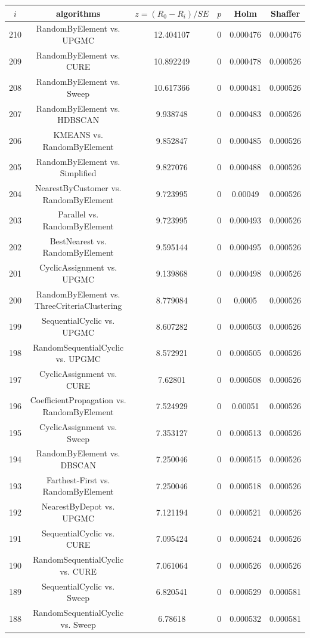 \documentclass[a4paper,10pt]{article}
\begin{document}
\begin{landscape}
\begin{table}[!htp]
\centering\scriptsize
\begin{tabular}{cccccc}
$i$&algorithms&$z=(R_0 - R_i)/SE$&$p$&Holm&Shaffer\\
\hline210&RandomByElement vs. UPGMC&12.404107&0&0.000476&0.000476\\
209&RandomByElement vs. CURE&10.892249&0&0.000478&0.000526\\
208&RandomByElement vs. Sweep&10.617366&0&0.000481&0.000526\\
207&RandomByElement vs. HDBSCAN&9.938748&0&0.000483&0.000526\\
206&KMEANS vs. RandomByElement&9.852847&0&0.000485&0.000526\\
205&RandomByElement vs. Simplified&9.827076&0&0.000488&0.000526\\
204&NearestByCustomer vs. RandomByElement&9.723995&0&0.00049&0.000526\\
203&Parallel vs. RandomByElement&9.723995&0&0.000493&0.000526\\
202&BestNearest vs. RandomByElement&9.595144&0&0.000495&0.000526\\
201&CyclicAssignment vs. UPGMC&9.139868&0&0.000498&0.000526\\
200&RandomByElement vs. ThreeCriteriaClustering&8.779084&0&0.0005&0.000526\\
199&SequentialCyclic vs. UPGMC&8.607282&0&0.000503&0.000526\\
198&RandomSequentialCyclic vs. UPGMC&8.572921&0&0.000505&0.000526\\
197&CyclicAssignment vs. CURE&7.62801&0&0.000508&0.000526\\
196&CoefficientPropagation vs. RandomByElement&7.524929&0&0.00051&0.000526\\
195&CyclicAssignment vs. Sweep&7.353127&0&0.000513&0.000526\\
194&RandomByElement vs. DBSCAN&7.250046&0&0.000515&0.000526\\
193&Farthest-First vs. RandomByElement&7.250046&0&0.000518&0.000526\\
192&NearestByDepot vs. UPGMC&7.121194&0&0.000521&0.000526\\
191&SequentialCyclic vs. CURE&7.095424&0&0.000524&0.000526\\
190&RandomSequentialCyclic vs. CURE&7.061064&0&0.000526&0.000526\\
189&SequentialCyclic vs. Sweep&6.820541&0&0.000529&0.000581\\
188&RandomSequentialCyclic vs. Sweep&6.78618&0&0.000532&0.000581\\

\end{tabular}
\end{table}
\end{landscape}
\end{document}
